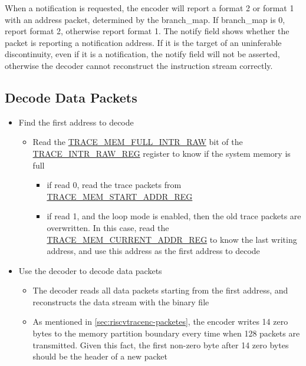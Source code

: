 \documentclass[main\_\_EN.tex]{subfiles}
\begin{document}
When a notification is requested, the encoder will report a format 2 or format 1 with an address packet, determined by the branch\_map. If branch\_map is 0, report format 2, otherwise report format 1. The notify field shows whether the packet is reporting a notification address. If it is the target of an uninferable discontinuity, even if it is a notification, the notify field will not be asserted, otherwise the decoder cannot reconstruct the instruction stream correctly.


\subsection{Decode Data Packets}

\begin{itemize}
    \item Find the first address to decode
        \begin{itemize}
            \item Read the \hyperref[fielddesc:TRACEMEMFULLINTRRAW]{TRACE\_MEM\_FULL\_INTR\_RAW} bit of the \hyperref[regdesc:TRACEINTRRAWREG]{TRACE\_INTR\_RAW\_REG} register to know if the system memory is full
            \begin{itemize}
                \item if read 0, read the trace packets from \hyperref[regdesc:TRACEMEMSTARTADDRREG]{TRACE\_MEM\_START\_ADDR\_REG}
                \item if read 1, and the loop mode is enabled, then the old trace packets are overwritten. In this case, read the \hyperref[regdesc:TRACEMEMCURRENTADDRREG]{TRACE\_MEM\_CURRENT\_ADDR\_REG} to know the last writing address, and use this address as the first address to decode
            \end{itemize}
        \end{itemize}

    \item Use the decoder to decode data packets
        \begin{itemize}
            \item The decoder reads all data packets starting from the first address, and reconstructs the data stream with the binary file
            \item As mentioned in \ref{sec:riscvtracenc-packetes}, the encoder writes 14 zero bytes to the memory partition boundary every time when 128 packets are transmitted. Given this fact, the first non-zero byte after 14 zero bytes should be the header of a new packet
        \end{itemize}
\end{itemize}
\end{document}
